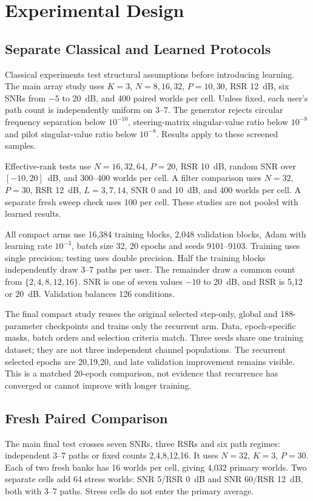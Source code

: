 \documentclass[10pt,journal,letterpaper]{IEEEtran}
\begin{document}
\section{Experimental Design}
\subsection{Separate Classical and Learned Protocols}
Classical experiments test structural assumptions before introducing learning. The main array study uses $K=3$, $N=8,16,32$, $P=10,30$, RSR 12~dB, six SNRs from $-5$ to 20~dB, and 400 paired worlds per cell. Unless fixed, each user's path count is independently uniform on 3--7. The generator rejects circular frequency separation below $10^{-10}$, steering-matrix singular-value ratio below $10^{-8}$ and pilot singular-value ratio below $10^{-8}$. Results apply to these screened samples.

Effective-rank tests use $N=16,32,64$, $P=20$, RSR 10~dB, random SNR over $[-10,20]$~dB, and 300--400 worlds per cell. A filter comparison uses $N=32$, $P=30$, RSR 12~dB, $L=3,7,14$, SNR 0 and 10~dB, and 400 worlds per cell. A separate fresh sweep check uses 100 per cell. These studies are not pooled with learned results.

All compact arms use 16,384 training blocks, 2,048 validation blocks, Adam with learning rate $10^{-3}$, batch size 32, 20 epochs and seeds 9101--9103. Training uses single precision; testing uses double precision. Half the training blocks independently draw 3--7 paths per user. The remainder draw a common count from $\{2,4,8,12,16\}$. SNR is one of seven values $-10$ to 20~dB, and RSR is 5,12 or 20~dB. Validation balances 126 conditions.

The final compact study reuses the original selected step-only, global and 188-parameter checkpoints and trains only the recurrent arm. Data, epoch-specific masks, batch orders and selection criteria match. Three seeds share one training dataset; they are not three independent channel populations. The recurrent selected epochs are 20,19,20, and late validation improvement remains visible. This is a matched 20-epoch comparison, not evidence that recurrence has converged or cannot improve with longer training.

\subsection{Fresh Paired Comparison}
The main final test crosses seven SNRs, three RSRs and six path regimes: independent 3--7 paths or fixed counts 2,4,8,12,16. It uses $N=32$, $K=3$, $P=30$. Each of two fresh banks has 16 worlds per cell, giving 4,032 primary worlds. Two separate cells add 64 stress worlds: SNR 5/RSR 0~dB and SNR 60/RSR 12~dB, both with 3--7 paths. Stress cells do not enter the primary average.
\end{document}
